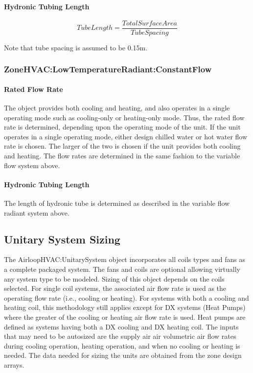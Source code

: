 \paragraph{Hydronic Tubing Length}\label{hydronic-tubing-length}

\begin{equation}
TubeLength = \frac{{TotalSurfaceArea}}{{TubeSpacing}}
\end{equation}

Note that tube spacing is assumed to be 0.15m.

\subsubsection{ZoneHVAC:LowTemperatureRadiant:ConstantFlow}\label{zonehvaclowtemperatureradiantconstantflow}

\paragraph{Rated Flow Rate}\label{rated-flow-rate}

The object provides both cooling and heating, and also operates in a single operating mode such as cooling-only or heating-only mode. Thus, the rated flow rate is determined, depending upon the operating mode of the unit. If the unit operates in a single operating mode, either design chilled water or hot water flow rate is chosen. The larger of the two is chosen if the unit provides both cooling and heating. The flow rates are determined in the same fashion to the variable flow system above.

\paragraph{Hydronic Tubing Length}\label{hydronic-tubing-length-1}

The length of hydronic tube is determined as described in the variable flow radiant system above.

\subsection{Unitary System Sizing}\label{unitary-system-sizing}

The AirloopHVAC:UnitarySystem object incorporates all coils types and fans as a complete packaged system. The fans and coils are optional allowing virtually any system type to be modeled. Sizing of this object depends on the coils selected. For single coil systems, the associated air flow rate is used as the operating flow rate (i.e., cooling or heating). For systems with both a cooling and heating coil, this methodology still applies except for DX systems (Heat Pumps) where the greater of the cooling or heating air flow rate is used. Heat pumps are defined as systems having both a DX cooling and DX heating coil. The inputs that may need to be autosized are the supply air air volumetric air flow rates during cooling operation, heating operation, and when no cooling or heating is needed. The data needed for sizing the units are obtained from the zone design arrays.

